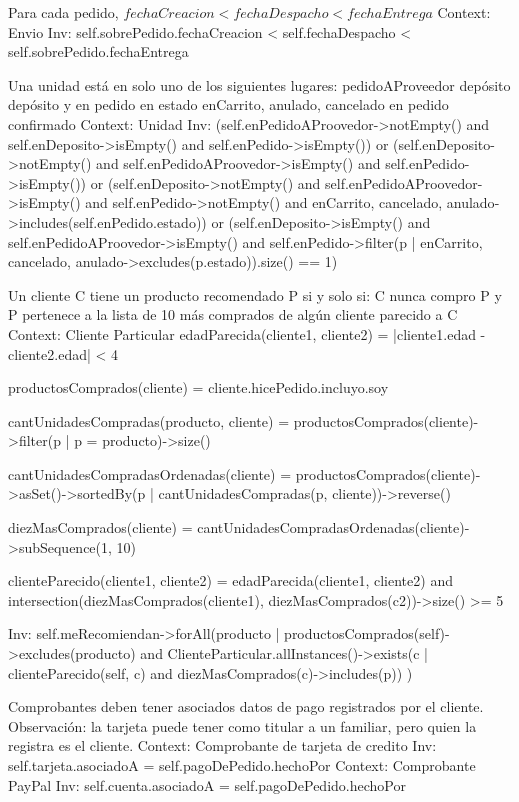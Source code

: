 \begin{listocl}
%
%
  \begin{itemocl}{Para cada pedido, $fechaCreacion < fechaDespacho < fechaEntrega$}
Context: Envio
Inv: self.sobrePedido.fechaCreacion < self.fechaDespacho < self.sobrePedido.fechaEntrega
  \end{itemocl}

%
%
  \begin{itemocl}{
      Una unidad está en solo uno de los siguientes lugares:
          pedidoAProveedor
          depósito
          depósito y en pedido en estado enCarrito, anulado, cancelado
          en pedido confirmado
    }
Context: Unidad
Inv:
(self.enPedidoAProovedor->notEmpty() and self.enDeposito->isEmpty() and self.enPedido->isEmpty())
or
(self.enDeposito->notEmpty() and self.enPedidoAProovedor->isEmpty() and self.enPedido->isEmpty())
or
(self.enDeposito->notEmpty() and self.enPedidoAProovedor->isEmpty() and self.enPedido->notEmpty() and {enCarrito, cancelado, anulado}->includes(self.enPedido.estado))
or
(self.enDeposito->isEmpty() and self.enPedidoAProovedor->isEmpty() and self.enPedido->filter(p | {enCarrito, cancelado, anulado}->excludes(p.estado)).size() == 1)
  \end{itemocl}

%
%
  \begin{itemocl}{
      Un cliente C tiene un producto recomendado P si y solo si:
          C nunca compro P y
          P pertenece a la lista de 10 más comprados de algún cliente parecido a C
    }
Context: Cliente Particular
  edadParecida(cliente1, cliente2) = |cliente1.edad - cliente2.edad| < 4
  
  productosComprados(cliente) = cliente.hicePedido.incluyo.soy
  
  cantUnidadesCompradas(producto, cliente) = productosComprados(cliente)->filter(p | p = producto)->size()

  cantUnidadesCompradasOrdenadas(cliente) = productosComprados(cliente)->asSet()->sortedBy(p | cantUnidadesCompradas(p, cliente))->reverse()

  diezMasComprados(cliente) = cantUnidadesCompradasOrdenadas(cliente)->subSequence(1, 10)

  clienteParecido(cliente1, cliente2) = edadParecida(cliente1, cliente2) and intersection(diezMasComprados(cliente1), diezMasComprados(c2))->size() >= 5

  Inv: self.meRecomiendan->forAll(producto | productosComprados(self)->excludes(producto) 
      and ClienteParticular.allInstances()->exists(c | clienteParecido(self, c) and diezMasComprados(c)->includes(p))
  )
  \end{itemocl}

%
%
  \begin{itemocl}{Comprobantes deben tener asociados datos de pago registrados por el cliente.
Observación: la tarjeta puede tener como titular a un familiar, pero quien la registra es el cliente.}
    Context: Comprobante de tarjeta de credito
    Inv: self.tarjeta.asociadoA = self.pagoDePedido.hechoPor
    Context: Comprobante PayPal
    Inv: self.cuenta.asociadoA = self.pagoDePedido.hechoPor
  \end{itemocl}
\end{listocl}
